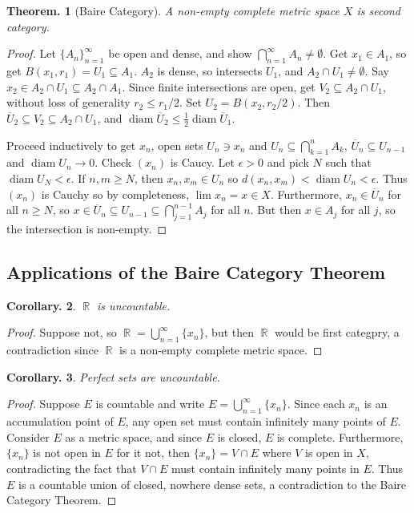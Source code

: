 \documentclass[11pt, a4paper]{memoir}
\DeclareMathOperator{\R}{{\mathbb{R}}}
\theoremstyle{change}
\newtheorem{theorem}{Theorem.}[section]
\newtheorem{corollary}[theorem]{Corollary.}
\theoremstyle{plain}
\theoremstyle{nonumberplain}
\newtheorem{proof}{Proof}
\DeclareMathOperator{\diam}{diam}
\numberwithin{equation}{section}
\begin{document}
\begin{theorem}[Baire Category]
    A non-empty complete metric space $X$ is second category.
\end{theorem}
\begin{proof}
    Let $\{A_n\}_{n=1}^\infty$ be open and dense, and show $\bigcap_{n=1}^\infty A_n\neq\emptyset$.
    Get $x_1\in A_1$, so get $B(x_1,r_1)=U_1\subseteq A_1$.
    $A_2$ is dense, so intersects $U_1$, and $A_2\cap U_1\neq\emptyset$.
    Say $x_2\in A_2\cap U_1\subseteq A_2\cap A_1$.
    Since finite intersections are open, get $V_2\subseteq A_2\cap U_1$, without loss of generality $r_2\leq r_1/2$.
    Set $U_2=B(x_2,r_2/2)$.
    Then $\overline{U}_2\subseteq V_2\subseteq A_2\cap U_1$, and $\diam\overline{U}_2\leq\frac{1}{2}\diam\overline{U}_1$.

    Proceed inductively to get $x_n$, open sets $U_n\ni x_n$ and $U_n\subseteq\bigcap_{k=1}^n A_k$, $\overline{U}_n\subseteq U_{n-1}$ and $\diam U_n\to 0$.
    Check $(x_n)$ is Caucy.
    Let $\epsilon>0$ and pick $N$ such that $\diam U_N<\epsilon$.
    If $n,m\geq N$, then $x_n,x_m\in U_n$ so $d(x_n,x_m)<\diam U_n<\epsilon$.
    Thus $(x_n)$ is Cauchy so by completeness, $\lim x_n=x\in X$.
    Furthermore, $x_n\in\overline{U}_n$ for all $n\geq N$, so $x\in\overline{U}_n\subseteq U_{n-1}\subseteq\bigcap_{j=1}^{n-1}A_j$ for all $n$.
    But then $x\in A_j$ for all $j$, so the intersection is non-empty.
\end{proof}
\subsection{Applications of the Baire Category Theorem}
\begin{corollary}
    $\R$ is uncountable.
\end{corollary}
\begin{proof}
    Suppose not, so $\R=\bigcup\limits_{n=1}^\infty\{x_n\}$, but then $\R$ would be first categpry, a contradiction since $\R$ is a non-empty complete metric space.
\end{proof}
\begin{corollary}
    Perfect sets are uncountable.
\end{corollary}
\begin{proof}
    Suppose $E$ is countable and write $E=\bigcup\limits_{n=1}^\infty\{x_n\}$.
    Since each $x_n$ is an accumulation point of $E$, any open set must contain infinitely many points of $E$.
    Consider $E$ as a metric space, and since $E$ is closed, $E$ is complete.
    Furthermore, $\{x_n\}$ is not open in $E$ for it not, then $\{x_n\}=V\cap E$ where $V$ is open in $X$, contradicting the fact that $V\cap E$ must contain infinitely many points in $E$.
    Thus $E$ is a countable union of closed, nowhere dense sets, a contradiction to the Baire Category Theorem.
\end{proof}
\end{document}
